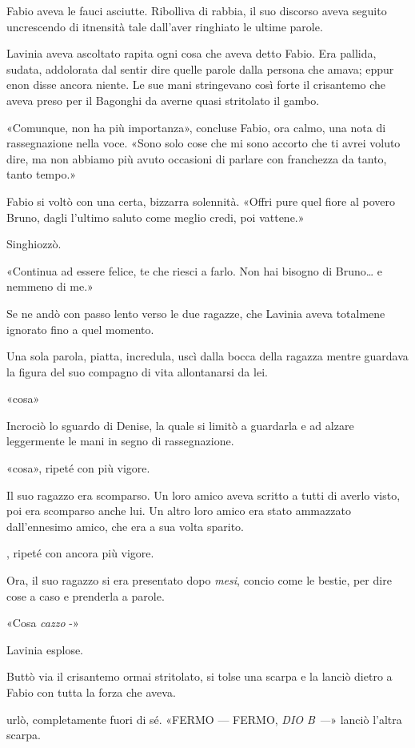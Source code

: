 Fabio aveva le fauci asciutte. Ribolliva di rabbia, il suo discorso aveva seguito uncrescendo di itnensità tale dall'aver ringhiato le ultime parole.

Lavinia aveva ascoltato rapita ogni cosa che aveva detto Fabio. Era pallida, sudata, addolorata dal sentir dire quelle parole dalla persona che amava; eppur enon disse ancora niente. Le sue mani stringevano così forte il crisantemo che aveva preso per il Bagonghi da averne quasi stritolato il gambo.

«Comunque, non ha più importanza», concluse Fabio, ora calmo, una nota di rassegnazione nella voce. «Sono solo cose che mi sono accorto che ti avrei voluto dire, ma non abbiamo più avuto occasioni di parlare con franchezza da tanto, tanto tempo.»

Fabio si voltò con una certa, bizzarra solennità. «Offri pure quel fiore al povero Bruno, dagli l'ultimo saluto come meglio credi, poi vattene.»

Singhiozzò.

«Continua ad essere felice, te che riesci a farlo. Non hai bisogno di Bruno\ldots{} e nemmeno di me.»

Se ne andò con passo lento verso le due ragazze, che Lavinia aveva totalmene ignorato fino a quel momento.

Una sola parola, piatta, incredula, uscì dalla bocca della ragazza mentre guardava la figura del suo compagno di vita allontanarsi da lei.

«cosa»

Incrociò lo sguardo di Denise, la quale si limitò a guardarla e ad alzare leggermente le mani in segno di rassegnazione.

«cosa», ripeté con più vigore.

Il suo ragazzo era scomparso. Un loro amico aveva scritto a tutti di averlo visto, poi era scomparso anche lui. Un altro loro amico era stato ammazzato dall'ennesimo amico, che era a sua volta sparito.

, ripeté con ancora più vigore.

Ora, il suo ragazzo si era presentato dopo \emph{mesi}, concio come le bestie, per dire cose a caso e prenderla a parole.

«Cosa \emph{cazzo} -»

Lavinia esplose.

Buttò via il crisantemo ormai stritolato, si tolse una scarpa e la lanciò dietro a Fabio con tutta la forza che aveva.

 urlò, completamente fuori di sé. «FERMO --- FERMO, \emph{DIO B ---}» lanciò l'altra scarpa.

